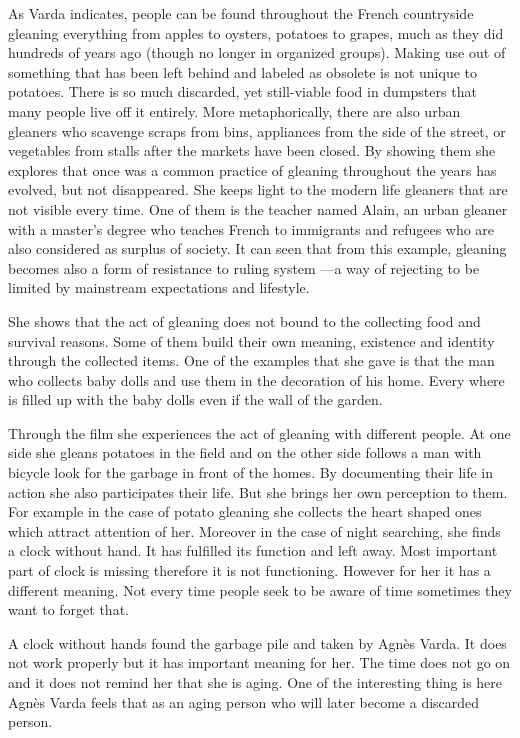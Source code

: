 As Varda indicates, people can be found throughout the French countryside gleaning everything from apples to oysters, potatoes to grapes, much as they did hundreds of years ago (though no longer in organized groups). Making use out of something that has been left behind and labeled as obsolete is not unique to potatoes. There is so much discarded, yet still-viable food in dumpsters that many people live off it entirely. More metaphorically, there are also urban gleaners who scavenge scraps from bins, appliances from the side of the street, or vegetables from stalls after the markets have been closed. By showing them she explores that once was a common practice of gleaning throughout the years has evolved, but not disappeared. She keeps light to the modern life gleaners that are not visible every time. One of them is the teacher named Alain, an urban gleaner with a master's degree who teaches French to immigrants and refugees who are also considered as surplus of society. It can seen that from this example, gleaning becomes also a form of resistance to ruling system ---a way of rejecting to be limited by mainstream expectations and lifestyle.

She shows that the act of gleaning does not bound to the collecting food and survival reasons. Some of them build their own meaning, existence and identity through the collected items. One of the examples that she gave is that the man who collects baby dolls and use them in the decoration of his home. Every where is filled up with the baby dolls even if the wall of the garden.

Through the film she experiences the act of gleaning with different people. At one side she gleans potatoes in the field and on the other side follows a man with bicycle look for the garbage in front of the homes. By documenting their life in action she also participates their life. But she brings her own perception to them. For example in the case of potato gleaning she collects the heart shaped ones which attract attention of her. Moreover in the case of night searching, she finds a clock without hand. It has fulfilled its function and left away. Most important part of clock is missing therefore it is not functioning. However for her it has a different meaning. Not every time people seek to be aware of time sometimes they want to forget that.

A clock without hands found the garbage pile and taken by Agnès Varda. It does not work properly but it has important meaning for her. The time does not go on and it does not remind her that she is aging. One of the interesting thing is here Agnès Varda feels that as an aging person who will later become a discarded person.

